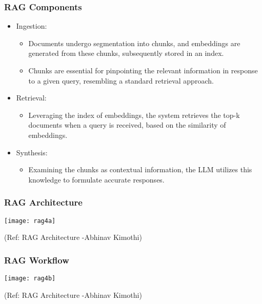 \begin{frame}[fragile]\frametitle{RAG Components}


\begin{itemize}
  \item Ingestion:
	\begin{itemize}
	  \item Documents undergo segmentation into chunks, and embeddings are generated from these chunks, subsequently stored in an index.
	  \item Chunks are essential for pinpointing the relevant information in response to a given query, resembling a standard retrieval approach.
	  \end{itemize}

  \item Retrieval:
	\begin{itemize}
	  \item Leveraging the index of embeddings, the system retrieves the top-k documents when a query is received, based on the similarity of embeddings.
	\end{itemize}
	  
  \item Synthesis:
	\begin{itemize}
	  \item Examining the chunks as contextual information, the LLM utilizes this knowledge to formulate accurate responses.
	\end{itemize}

\end{itemize}

\end{frame}

\begin{frame}[fragile]\frametitle{RAG Architecture}


		\begin{center}
		\texttt{[image: rag4a]}
		\end{center}

{\tiny (Ref: RAG Architecture -Abhinav  Kimothi)}

\end{frame}

\begin{frame}[fragile]\frametitle{RAG Workflow}


		\begin{center}
		\texttt{[image: rag4b]}
		\end{center}

{\tiny (Ref: RAG Architecture -Abhinav  Kimothi)}

\end{frame}

